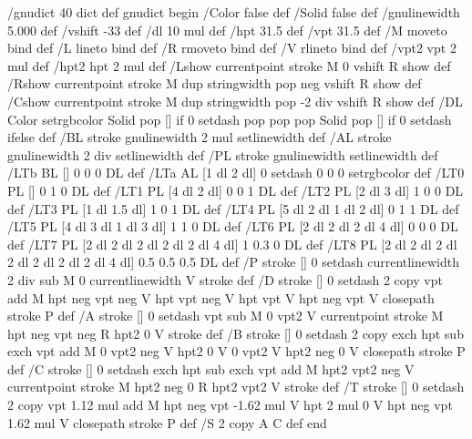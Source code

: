  /gnudict 40 dict def gnudict begin /Color false def /Solid false def
/gnulinewidth 5.000 def /vshift -33 def /dl {10 mul} def /hpt 31.5
def /vpt 31.5 def /M {moveto} bind def /L {lineto} bind def /R {rmoveto}
bind def /V {rlineto} bind def /vpt2 vpt 2 mul def /hpt2 hpt 2 mul
def /Lshow { currentpoint stroke M 0 vshift R show } def /Rshow { currentpoint
stroke M dup stringwidth pop neg vshift R show } def /Cshow { currentpoint
stroke M dup stringwidth pop -2 div vshift R show } def /DL { Color
{setrgbcolor Solid {pop []} if 0 setdash } {pop pop pop Solid {pop
[]} if 0 setdash} ifelse } def /BL { stroke gnulinewidth 2 mul setlinewidth
} def /AL { stroke gnulinewidth 2 div setlinewidth } def /PL { stroke
gnulinewidth setlinewidth } def /LTb { BL [] 0 0 0 DL } def /LTa {
AL [1 dl 2 dl] 0 setdash 0 0 0 setrgbcolor } def /LT0 { PL [] 0 1 0
DL } def /LT1 { PL [4 dl 2 dl] 0 0 1 DL } def /LT2 { PL [2 dl 3 dl]
1 0 0 DL } def /LT3 { PL [1 dl 1.5 dl] 1 0 1 DL } def /LT4 { PL [5
dl 2 dl 1 dl 2 dl] 0 1 1 DL } def /LT5 { PL [4 dl 3 dl 1 dl 3 dl] 1
1 0 DL } def /LT6 { PL [2 dl 2 dl 2 dl 4 dl] 0 0 0 DL } def /LT7 {
PL [2 dl 2 dl 2 dl 2 dl 2 dl 4 dl] 1 0.3 0 DL } def /LT8 { PL [2 dl
2 dl 2 dl 2 dl 2 dl 2 dl 2 dl 4 dl] 0.5 0.5 0.5 DL } def /P { stroke
[] 0 setdash currentlinewidth 2 div sub M 0 currentlinewidth V stroke
} def /D { stroke [] 0 setdash 2 copy vpt add M hpt neg vpt neg V hpt
vpt neg V hpt vpt V hpt neg vpt V closepath stroke P } def /A { stroke
[] 0 setdash vpt sub M 0 vpt2 V currentpoint stroke M hpt neg vpt neg
R hpt2 0 V stroke } def /B { stroke [] 0 setdash 2 copy exch hpt sub
exch vpt add M 0 vpt2 neg V hpt2 0 V 0 vpt2 V hpt2 neg 0 V closepath
stroke P } def /C { stroke [] 0 setdash exch hpt sub exch vpt add M
hpt2 vpt2 neg V currentpoint stroke M hpt2 neg 0 R hpt2 vpt2 V stroke
} def /T { stroke [] 0 setdash 2 copy vpt 1.12 mul add M hpt neg vpt
-1.62 mul V hpt 2 mul 0 V hpt neg vpt 1.62 mul V closepath stroke P
} def /S { 2 copy A C} def end
 
